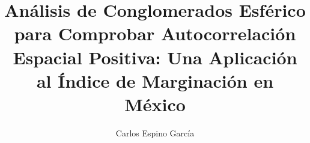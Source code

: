 \title{Análisis de Conglomerados Esférico para Comprobar Autocorrelación Espacial Positiva: Una Aplicación al Índice de Marginación en México}
\author{Carlos Espino García}

\maketitle
\makeitamdoc












